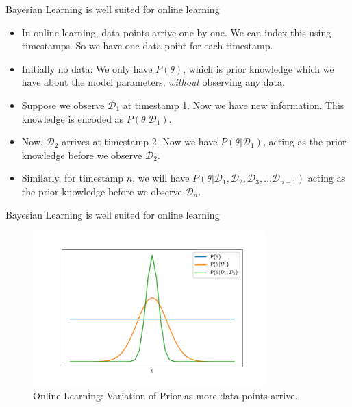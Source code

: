 \documentclass{beamer}
\begin{document}
\begin{frame}{Bayesian Learning is well suited for online learning}
\begin{itemize}
\item In online learning, data points arrive one by one. We can index this using timestamps. So we have one data point for each timestamp.
\item Initially no data: We only have $P(\theta)$, which is prior knowledge which we have about the model parameters, \emph{without} observing any data.
\item Suppose we observe $\mathcal{D}_1$ at timestamp 1. Now we have new information. This knowledge is encoded as $P(\theta | \mathcal{D}_1)$. 
\item Now, $\mathcal{D}_2$ arrives at timestamp 2. Now we have $P(\theta | \mathcal{D}_1)$, acting as the prior knowledge before we observe $\mathcal{D}_2$.
\item Similarly, for timestamp $n$, we will have $P(\theta | \mathcal{D}_1, \mathcal{D}_2, \mathcal{D}_3, \dots \mathcal{D}_{n-1})$ acting as the prior knowledge before we observe $\mathcal{D}_n$.
\end{itemize}
\end{frame}

\begin{frame}{Bayesian Learning is well suited for online learning}
\begin{figure}[htp]
    \centering
    \includegraphics[width=9cm]{plots/online.pdf}
    \caption{Online Learning: Variation of Prior as more data points arrive.}
    \label{fig:online}
\end{figure}

\end{frame}





\end{document}

